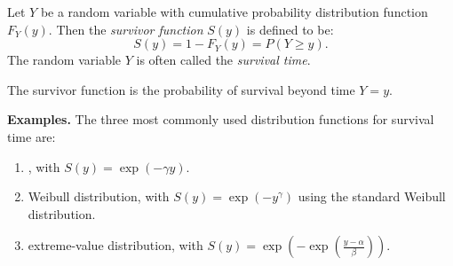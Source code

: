 \documentclass[12pt]{article}
\begin{document}
Let $Y$ be a random variable with cumulative probability distribution function $F_Y(y)$.  Then the \emph{survivor function} $S(y)$ is defined to be:
$$S(y) = 1 - F_Y(y) = P(Y\geq y).$$
The random variable $Y$ is often called the \emph{survival time}.

The survivor function is the probability of survival beyond time $Y=y$.

\textbf{Examples.} The three most commonly used distribution functions for survival time are:
\begin{enumerate}
\item {}, with $S(y)=\exp(-\gamma y).$
\item Weibull distribution, with $S(y)=\exp(-y^{\gamma})$ using the standard Weibull distribution.
\item extreme-value distribution, with $S(y)=\exp(-\exp(\displaystyle{\frac{y-\alpha}{\beta}})).$
\end{enumerate}
\end{document}
